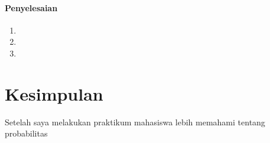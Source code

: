 \documentclass[a4paper,12pt]{article}
\begin{document}
\paragraph{Penyelesaian\\}
\begin{enumerate}[label=\alph*.]
	\item 
	\begin{minipage}[t]{\linewidth}
		\raggedright
	\end{minipage}
	\item 
\begin{minipage}[t]{\linewidth}
	\raggedright
\end{minipage}
	\item 
\begin{minipage}[t]{\linewidth}
	\raggedright
\end{minipage}
\end{enumerate}
\newpage
\section{Kesimpulan}
Setelah saya melakukan praktikum mahasiswa lebih memahami tentang probabilitas
\end{document}
